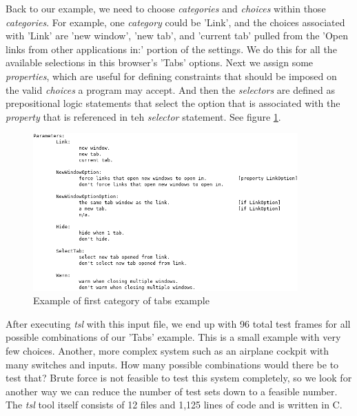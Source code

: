 \documentclass[a4full,12pt]{article}
\begin{document}
Back to our example, we need to choose \emph{categories} and \emph{choices} within those
  \emph{categories}. For example, one \emph{category} could be 'Link', and the choices
  associated with 'Link' are 'new window', 'new tab', and 'current tab' pulled from the
  'Open links from other applications in:' portion of the settings. We do this for all
  the available selections in this browser's 'Tabs' options. Next we assign some 
  \emph{properties}, which are useful for defining constraints that should be imposed on
  the valid \emph{choices} a program may accept. And then the \emph{selectors} are defined
  as prepositional logic statements that select the option that is associated with the 
  \emph{property} that is referenced in teh \emph{selector} statement. See figure \ref{fig:tsl_input_final}.
\begin{figure}[htb]
\centering
\includegraphics[width=4in,keepaspectratio]{images/tsl_input_final.png}
\caption{Example of first category of tabs example}
\label{fig:tsl_input_final}
\end{figure}

After executing \emph{tsl} with this input file, we end up with 96 total test frames
  for all possible combinations of our 'Tabs' example. This is a small example with very
  few choices. Another, more complex system such as an airplane cockpit with many switches
  and inputs. How many possible combinations would there be to test that? Brute force is not
  feasible to test this system completely, so we look for another way we can reduce the number
  of test sets down to a feasible number. The \emph{tsl} tool itself consists of 12 files and
  1,125 lines of code and is written in C.
\end{document}
